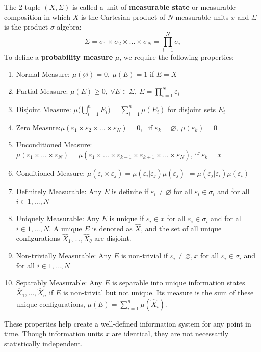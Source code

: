 \documentclass[10pt, a5paper, twoside, openright]{memoir}
\begin{document}
The $2$-tuple $(X, \Sigma)$ is called a unit of \textbf{measurable state} or measurable composition in which $X$ is the Cartesian product of $N$ measurable units $x$ and $\Sigma$ is the product $\sigma$-algebra:
$$\Sigma = \sigma_1 \times \sigma_2 \times ... \times \sigma_N = \prod\limits^{N}_{i=1} \sigma_i$$
To define a \textbf{probability measure} $\mu$, we require the following properties:
\begin{enumerate}
\item Normal Measure: $\mu(\varnothing) = 0, \ \mu(E) = 1$ if $E = X$
\item Partial Measure: $\mu (E) \geq 0, \ \forall E \in \Sigma, \ E = \prod\limits^{N}_{i=1} \varepsilon_i$
\item Disjoint Measure: $\mu \Big ( \bigcup\limits^{n}_{i=1} E_i \Big ) = \sum\limits^{n}_{i=1} \mu(E_i)$ for disjoint sets $E_i$
\item Zero Measure:$\mu (\varepsilon_1 \times \varepsilon_2 \times ... \times \varepsilon_N) = 0$, \ if $\varepsilon_k = \varnothing, \ \mu(\varepsilon_k) = 0$
\item Unconditioned Measure: $\mu(\varepsilon_1 \times ... \times \varepsilon_N) = \mu(\varepsilon_1 \times ... \times \varepsilon_{k-1} \times \varepsilon_{k+1} \times ... \times \varepsilon_N)$, if $\varepsilon_k = x$
\item Conditioned Measure: $\mu(\varepsilon_i \times \varepsilon_j) = \mu(\varepsilon_i | \varepsilon_j)\mu(\varepsilon_j)$ $= \mu(\varepsilon_j | \varepsilon_i)\mu(\varepsilon_i)$
\item Definitely Measurable: Any $E$ is definite if $\varepsilon_i \neq \varnothing$ for all $\varepsilon_i \in \sigma_i$ and for all $i \in {1,...,N}$
\item Uniquely Measurable: Any $E$ is unique if $\varepsilon_i \in x$ for all $\varepsilon_i \in \sigma_i$ and for all $i \in {1,...,N}$. A unique $E$ is denoted as $\hat X$, and the set of all unique configurations $\hat X_1,..., \hat X_\theta$ are disjoint.
\item Non-trivially Measurable: Any $E$ is non-trivial if $\varepsilon_i \neq \varnothing, x$ for all $\varepsilon_i \in \sigma_i$ and for all $i \in {1,...,N}$
\item Separably Measurable: Any $E$ is separable into unique information states $\hat X_1 ,..., \hat X_n$ if $E$ is non-trivial but not unique. Its measure is the sum of these unique configurations, $\mu(E) = \sum\limits^{n}_{i=1} \mu(\hat X_i)$.
\end{enumerate}
These properties help create a well-defined information system for any point in time. Though information units $x$ are identical, they are not necessarily statistically independent.
\end{document}
